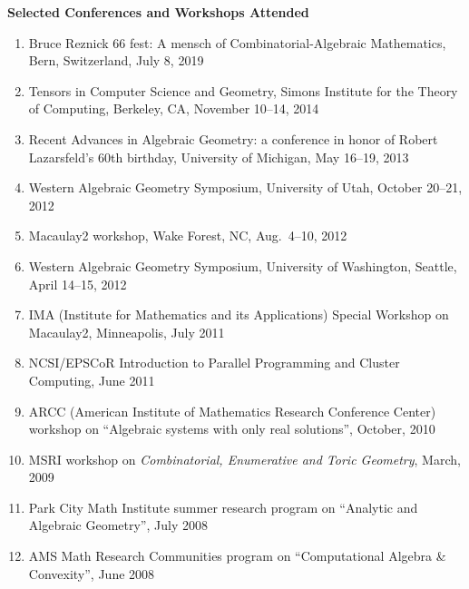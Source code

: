 \documentclass[12pt]{article}
\begin{document}
\textbf{Selected Conferences and Workshops Attended}
\begin{enumerate}[revarabic]
\item Bruce Reznick 66 fest: A mensch of Combinatorial-Algebraic Mathematics, Bern, Switzerland, July 8, 2019
\item Tensors in Computer Science and Geometry, Simons Institute for the Theory of Computing, Berkeley, CA, November 10--14, 2014
\item Recent Advances in Algebraic Geometry: a conference in honor of Robert Lazarsfeld's 60th birthday,
University of Michigan, May 16--19, 2013
\item Western Algebraic Geometry Symposium, University of Utah, October 20--21, 2012
\item Macaulay2 workshop, Wake Forest, NC, Aug.~4--10, 2012
\item Western Algebraic Geometry Symposium, University of Washington, Seattle, April 14--15, 2012
\item IMA (Institute for Mathematics and its Applications) Special Workshop on Macaulay2, Minneapolis, July 2011
\item NCSI/EPSCoR Introduction to Parallel Programming and Cluster Computing, June 2011
\item ARCC (American Institute of Mathematics Research Conference Center) workshop on
``Algebraic systems with only real solutions'', October, 2010
\item MSRI workshop on \textit{Combinatorial, Enumerative and Toric Geometry}, March, 2009
\item Park City Math Institute summer research program on ``Analytic and Algebraic Geometry'', July 2008
\item AMS Math Research Communities program on ``Computational Algebra \& Convexity'', June 2008
\end{enumerate}

\end{document}
